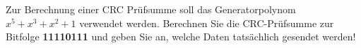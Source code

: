 
Zur Berechnung einer CRC Prüfsumme soll das Generatorpolynom $x^5 + x^3 + x^2 + 1$ verwendet werden.
Berechnen Sie die CRC-Prüfsumme zur Bitfolge \textbf{11110111} und geben Sie an, welche Daten tatsächlich gesendet werden!